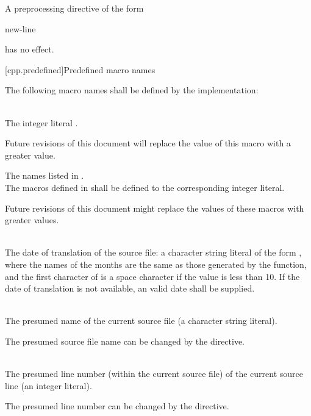 \pnum
A preprocessing directive of the form
\begin{ncsimplebnf}
\terminal{\#} new-line
\end{ncsimplebnf}
has no effect.

[cpp.predefined]{Predefined macro names}
%

\pnum
The following macro names shall be defined by the implementation:

\begin{description}

\item
{}%
\\
The integer literal \tcode{\cppver}.
\begin{note}
Future revisions of this document will
replace the value of this macro with a greater value.
\end{note}

\item The names listed in .\\
The macros defined in  shall be defined to
the corresponding integer literal.
\begin{note}
Future revisions of this document might replace
the values of these macros with greater values.
\end{note}

\item
{}%
\\
The date of translation of the source file:
a character string literal of the form
,
where the names of the months are the same as those generated
by the
function,
and the first character of
is a space character if the value is less than 10.
If the date of translation is not available,
an  valid date
shall be supplied.

\item
{}%
\\
The presumed name of the current source file (a character string
literal).
\begin{footnote}
The presumed source file name can be changed by the  directive.
\end{footnote}

\item
{}%
\\
The presumed line number (within the current source file) of the current source line
(an integer literal).
\begin{footnote}
The presumed line number can be changed by the  directive.
\end{footnote}


\end{description}
